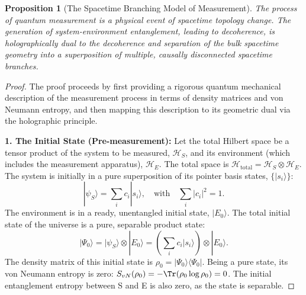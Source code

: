 \documentclass[11pt, letterpaper]{report}
\theoremstyle{plain} %
\newtheorem{proposition}[theorem]{Proposition}
\theoremstyle{definition} %
\theoremstyle{remark} %
\begin{document}
\begin{proposition}[The Spacetime Branching Model of Measurement]
\label{prop:explore_branching}
The process of quantum measurement is a physical event of spacetime topology change. The generation of system-environment entanglement, leading to decoherence, is holographically dual to the decoherence and separation of the bulk spacetime geometry into a superposition of multiple, causally disconnected spacetime branches.
\end{proposition}
\begin{proof}
The proof proceeds by first providing a rigorous quantum mechanical description of the measurement process in terms of density matrices and von Neumann entropy, and then mapping this description to its geometric dual via the holographic principle.

\textbf{1. The Initial State (Pre-measurement):}
Let the total Hilbert space be a tensor product of the system to be measured, $\mathcal{H}_S$, and its environment (which includes the measurement apparatus), $\mathcal{H}_E$. The total space is $\mathcal{H}_{\text{total}} = \mathcal{H}_S \otimes \mathcal{H}_E$.
The system is initially in a pure superposition of its pointer basis states, $\{|s_i\rangle\}$:
\begin{equation}
    |\psi_S\rangle = \sum_i c_i |s_i\rangle, \quad \text{with} \quad \sum_i |c_i|^2 = 1.
\end{equation}
The environment is in a ready, unentangled initial state, $|E_0\rangle$. The total initial state of the universe is a pure, separable product state:
\begin{equation}
    |\Psi_0\rangle = |\psi_S\rangle \otimes |E_0\rangle = \left(\sum_i c_i |s_i\rangle\right) \otimes |E_0\rangle.
\end{equation}
The density matrix of this initial state is $\rho_0 = |\Psi_0\rangle\langle\Psi_0|$. Being a pure state, its von Neumann entropy is zero: $S_{vN}(\rho_0) = -\Tr(\rho_0 \log\rho_0) = 0$. The initial entanglement entropy between S and E is also zero, as the state is separable.


\end{proof}
\end{document}
